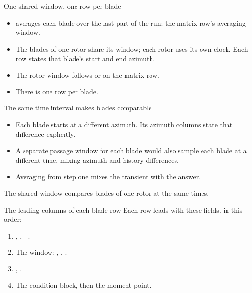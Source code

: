 %
\section{}

\begin{frame}{One shared window, one row per blade}
\begin{itemize}\small
  \item {} averages each blade
        over the last part of the run: the matrix row's averaging window.
  \item The blades of one rotor share its window; each rotor uses its own clock.
        Each row states that blade's start
        and end azimuth.
  \item The rotor window follows
         or  on the matrix row.
  \item There is one row per blade.
\end{itemize}
\end{frame}

\begin{frame}{The same time interval makes blades comparable}
\begin{itemize}
  \item Each blade starts at a different azimuth. Its azimuth columns
        state that difference explicitly.
  \item A separate passage window for each blade would also sample each
        blade at a different time, mixing azimuth and history differences.
  \item Averaging from step one mixes the transient with the answer.
\end{itemize}
\begin{takeaway}
The shared window compares blades of one rotor at the same times.
\end{takeaway}
\end{frame}

\begin{frame}{The leading columns of each blade row}
\small Each row leads with these fields, in this order:
\begin{enumerate}
  \item {}, , , .
  \item The window: , , .
  \item {}, .
  \item The condition block, then the moment point.
\end{enumerate}
\end{frame}

